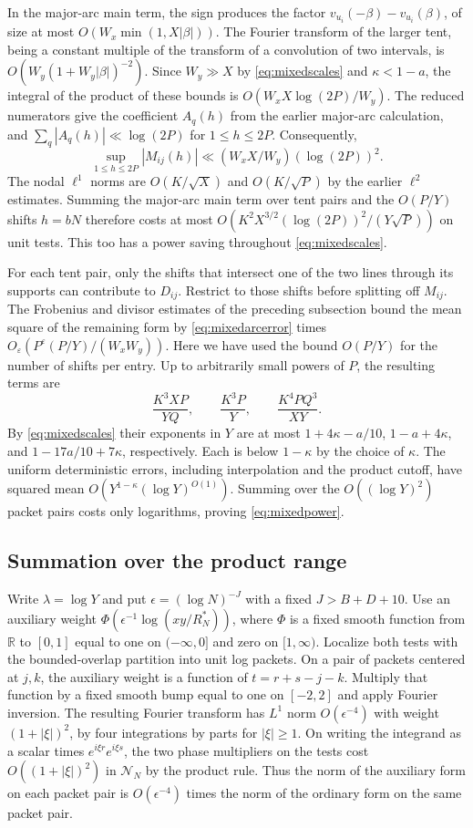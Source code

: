 \documentclass[11pt,a4paper]{article}
\numberwithin{equation}{section}
\newcommand{\NN}{\mathcal N_N}
\begin{document}
In the major-arc main term, the sign produces the factor
$v_{u_i}(-\beta)-v_{u_i}(\beta)$, of size at most
$O(W_x\min(1,X|\beta|))$. The Fourier transform of the
larger tent, being a constant multiple of the transform
of a convolution of two intervals, is
$O(W_y(1+W_y|\beta|)^{-2})$. Since $W_y\gg X$ by
\cref{eq:mixedscales} and $\kappa<1-a$, the integral of
the product of these bounds is $O(W_x X\log(2P)/W_y)$.
The reduced numerators give the coefficient $A_q(h)$
from the earlier major-arc calculation, and
$\sum_q |A_q(h)|\ll\log(2P)$ for $1\le h\le2P$.
Consequently,
\[
 \sup_{1\le h\le2P}|M_{ij}(h)|
           \ll (W_x X/W_y)(\log(2P))^2 .
\]
The nodal $\ell^1$ norms are $O(K/\sqrt X)$ and
$O(K/\sqrt P)$ by the earlier $\ell^2$ estimates.
Summing the major-arc main term over tent pairs and the
$O(P/Y)$ shifts $h=bN$ therefore costs at most
$O(K^2 X^{3/2}(\log(2P))^2/(Y\sqrt P))$ on unit tests.
This too has a power saving throughout \cref{eq:mixedscales}.

For each tent pair, only the shifts that intersect one
of the two lines through its supports can contribute to
$D_{ij}$. Restrict to those shifts before splitting off
$M_{ij}$. The Frobenius and divisor estimates of the
preceding subsection bound the mean square of the
remaining form by \cref{eq:mixedarcerror} times
$O_\varepsilon(P^\varepsilon(P/Y)/(W_xW_y))$.
Here we have used the bound $O(P/Y)$ for the number of
shifts per entry. Up to arbitrarily small powers of $P$,
the resulting terms are
\[
 \frac{K^3XP}{YQ},\qquad
 \frac{K^3P}{Y},\qquad \frac{K^4P Q^3}{XY}.
\]
By \cref{eq:mixedscales} their exponents in $Y$ are at most
$1+4\kappa-a/10$, $1-a+4\kappa$, and
$1-17a/10+7\kappa$, respectively. Each is below $1-\kappa$
by the choice of $\kappa$. The uniform deterministic
errors, including interpolation and the product cutoff,
have squared mean $O(Y^{1-\kappa}(\log Y)^{O(1)})$.
Summing over the $O((\log Y)^2)$ packet pairs costs only
logarithms, proving \cref{eq:mixedpower}.

\subsection{Summation over the product range}

Write $\lambda=\log Y$ and put $\epsilon=(\log N)^{-J}$
with a fixed $J>B+D+10$. Use an auxiliary weight
$\Phi(\epsilon^{-1}\log(xy/R_N^*))$, where $\Phi$ is a fixed
smooth function from $\mathbb R$ to $[0,1]$ equal to one
on $(-\infty,0]$ and zero on $[1,\infty)$.
Localize both tests with the bounded-overlap
partition into unit log packets. On a pair of packets centered at
$j,k$, the auxiliary weight is a function of
$t=r+s-j-k$. Multiply that function by a fixed smooth bump equal
to one on $[-2,2]$ and apply Fourier inversion. The resulting
Fourier transform has $L^1$ norm $O(\epsilon^{-4})$ with weight
$(1+|\xi|)^2$, by four integrations by parts for $|\xi|\ge1$.
On writing the integrand as a scalar times
$e^{i\xi r}e^{i\xi s}$, the two phase multipliers on the tests
cost $O((1+|\xi|)^2)$ in $\NN$ by the product rule. Thus the
norm of the auxiliary form on each packet pair is
$O(\epsilon^{-4})$ times
the norm of the ordinary form on the same packet pair.
\end{document}
